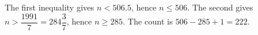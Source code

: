 The first inequality gives $n<506.5$, hence $n\le506$. The second gives $n>\dfrac{1991}{7}=284\dfrac{3}{7}$, hence $n\ge285$. The count is $506-285+1=\boxed{222}$.

